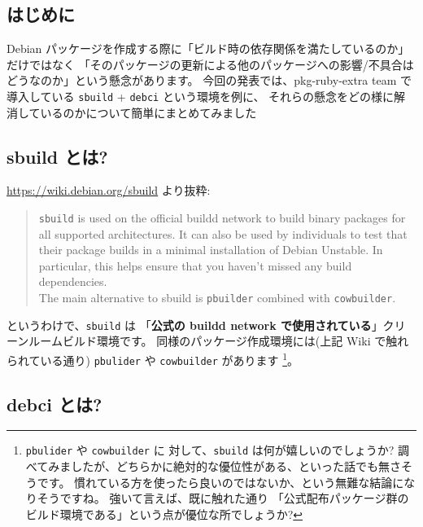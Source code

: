 \documentclass[mingoth,a4paper]{jsarticle}
\begin{document}

\subsection{はじめに}
  Debian パッケージを作成する際に「ビルド時の依存関係を満たしているのか」だけではなく
  「そのパッケージの更新による他のパッケージへの影響/不具合はどうなのか」という懸念があります。
  今回の発表では、pkg-ruby-extra team で導入している
  \texttt{sbuild} + \texttt{debci} という環境を例に、
  それらの懸念をどの様に解消しているのかについて簡単にまとめてみました


\subsection*{sbuild とは?}

\url{https://wiki.debian.org/sbuild} より抜粋:
\begin{quote}
  \texttt{sbuild} is used on the official buildd network to build binary
  packages for all supported architectures.
  It can also be used by individuals to test that their package builds
  in a minimal installation of Debian Unstable.
  In particular, this helps ensure that you haven't missed any build
  dependencies.
  \\[1em]
  The main alternative to sbuild is \texttt{pbuilder} combined with \texttt{cowbuilder}.
\end{quote}
というわけで、\texttt{sbuild} は
「\textbf{公式の buildd network で使用されている}」クリーンルームビルド環境です。
同様のパッケージ作成環境には(上記 Wiki で触れられている通り)
\texttt{pbulider} や \texttt{cowbuilder} があります
\footnote{%
  \texttt{pbulider} や \texttt{cowbuilder} に
  対して、\texttt{sbuild} は何が嬉しいのでしょうか?
  調べてみましたが、どちらかに絶対的な優位性がある、といった話でも無さそうです。
  慣れている方を使ったら良いのではないか、という無難な結論になりそうですね。
  強いて言えば、既に触れた通り
  「公式配布パッケージ群のビルド環境である」という点が優位な所でしょうか?
}。

\subsection*{debci とは?}
\end{document}

